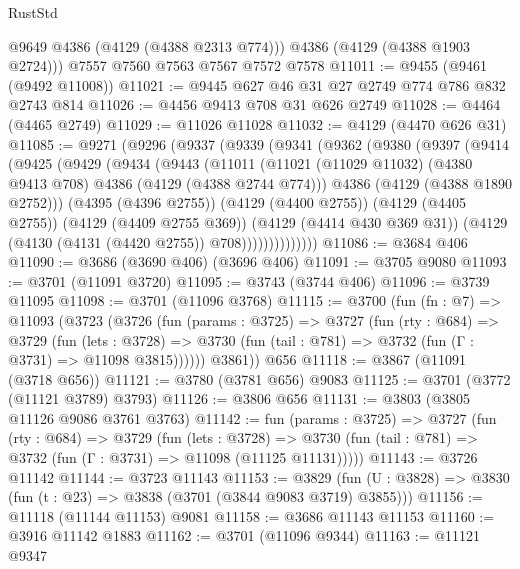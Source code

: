\begin{lexlean}{RustStd}
\begin{coremodule}
{\begin{coremodule}
{{{{{{{{{{{{{{        @9649
        @4386
        (@4129 (@4388 @2313 @774)))
      @4386
      (@4129 (@4388 @1903 @2724)))
    @7557
    @7560
    @7563
    @7567
    @7572
    @7578
@11011 := @9455 (@9461 (@9492 @11008))
@11021 := @9445 @627 @46 @31 @27 @2749 @774 @786 @832 @2743 @814
@11026 := @4456 @9413 @708 @31 @626 @2749
@11028 := @4464 (@4465 @2749)
@11029 := @11026 @11028
@11032 := @4129 (@4470 @626 @31)
@11085 := @9271
    (@9296
      (@9337
        (@9339
          (@9341
            (@9362
              (@9380
                (@9397
                  (@9414
                    (@9425
                      (@9429
                        (@9434
                          (@9443
                            (@11011
                              (@11021
                                (@11029 @11032)
                                (@4380 @9413 @708)
                                @4386
                                (@4129 (@4388 @2744 @774)))
                              @4386
                              (@4129 (@4388 @1890 @2752)))
                            (@4395 (@4396 @2755))
                            (@4129 (@4400 @2755))
                            (@4129 (@4405 @2755))
                            (@4129 (@4409 @2755 @369))
                            (@4129 (@4414 @430 @369 @31))
                            (@4129 (@4130 (@4131 (@4420 @2755)) @708))))))))))))))
@11086 := @3684 @406
@11090 := @3686 (@3690 @406) (@3696 @406)
@11091 := @3705 @9080
@11093 := @3701 (@11091 @3720)
@11095 := @3743 (@3744 @406)
@11096 := @3739 @11095
@11098 := @3701 (@11096 @3768)
@11115 := @3700
    (fun (fn : @7) =>
    @11093
      (@3723
        (@3726
          (fun (params : @3725) =>
          @3727
            (fun (rty : @684) =>
            @3729
              (fun (lets : @3728) =>
              @3730 (fun (tail : @781) => @3732 (fun (Γ : @3731) => @11098 @3815))))))
        @3861))
    @656
@11118 := @3867 (@11091 (@3718 @656))
@11121 := @3780 (@3781 @656) @9083
@11125 := @3701 (@3772 (@11121 @3789) @3793)
@11126 := @3806 @656
@11131 := @3803 (@3805 @11126 @9086 @3761 @3763)
@11142 := fun (params : @3725) =>
  @3727
    (fun (rty : @684) =>
    @3729
      (fun (lets : @3728) =>
      @3730 (fun (tail : @781) => @3732 (fun (Γ : @3731) => @11098 (@11125 @11131)))))
@11143 := @3726 @11142
@11144 := @3723 @11143
@11153 := @3829
    (fun (U : @3828) => @3830 (fun (t : @23) => @3838 (@3701 (@3844 @9083 @3719) @3855)))
@11156 := @11118 (@11144 @11153) @9081
@11158 := @3686 @11143 @11153
@11160 := @3916 @11142 @1883
@11162 := @3701 (@11096 @9344)
@11163 := @11121 @9347
}}}}}}}}}}}}}}
\end{coremodule}}
\end{coremodule}
\end{lexlean}
